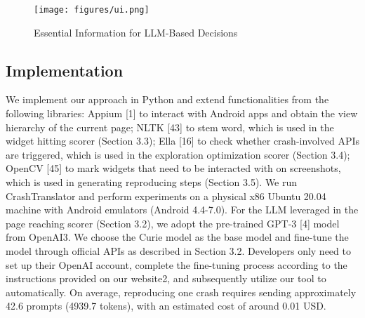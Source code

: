 \begin{figure}[h]
    \centering
    \texttt{[image: figures/ui.png]}
    \caption{Essential Information for LLM-Based Decisions}
    \label{fig:decision}
\end{figure}







\subsection{Implementation}
We implement our approach in Python and extend functionalities from the following libraries: Appium [1] to interact with Android apps and obtain the view hierarchy of the current page; NLTK [43] to stem word, which is used in the widget hitting scorer (Section 3.3); Ella [16] to check whether crash-involved APIs are triggered, which is used in the exploration optimization scorer (Section 3.4); OpenCV [45] to mark widgets that need to be interacted with on screenshots, which is used in generating reproducing steps (Section 3.5). We run CrashTranslator and perform experiments on a physical x86 Ubuntu 20.04 machine with Android emulators (Android 4.4-7.0).
For the LLM leveraged in the page reaching scorer (Section 3.2), we adopt the pre-trained GPT-3 [4] model from OpenAI3. We choose the Curie model as the base model and fine-tune the model through official APIs as described in Section 3.2. Developers only need to set up their OpenAI account, complete the fine-tuning process according to the instructions provided on our website2, and subsequently utilize our tool to automatically. On average, reproducing one crash requires sending approximately 42.6 prompts (4939.7 tokens), with an estimated cost of around 0.01 USD.
